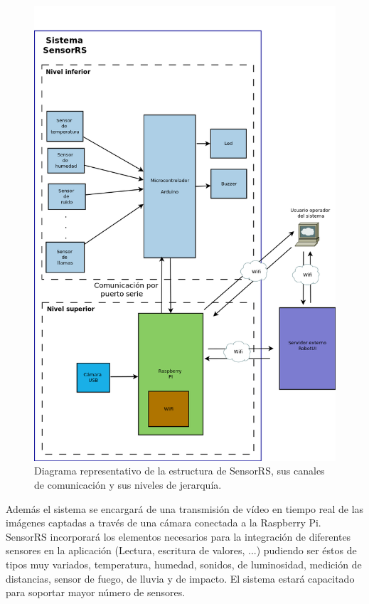 \begin{figure}[H]
  \begin{center}
    \includegraphics[scale=0.5]{diagramas/diagrama_bloques_general.png}
  \end{center}
  \caption{ Diagrama representativo de la estructura de SensorRS, sus canales de comunicación y sus niveles de jerarquía.}
  \label{diagrama:representacion_sistema}
\end{figure}


Además el sistema se encargará de una transmisión de vídeo en tiempo real de las imágenes captadas a través de una cámara conectada a la Raspberry Pi.\\

SensorRS incorporará los elementos necesarios para la integración de diferentes sensores en la aplicación (Lectura, escritura de valores, ...) pudiendo ser éstos de tipos muy
variados, temperatura, humedad, sonidos, de luminosidad, medición de distancias, sensor de fuego, de lluvia y de impacto. El sistema estará capacitado para soportar mayor número
de sensores. \\

